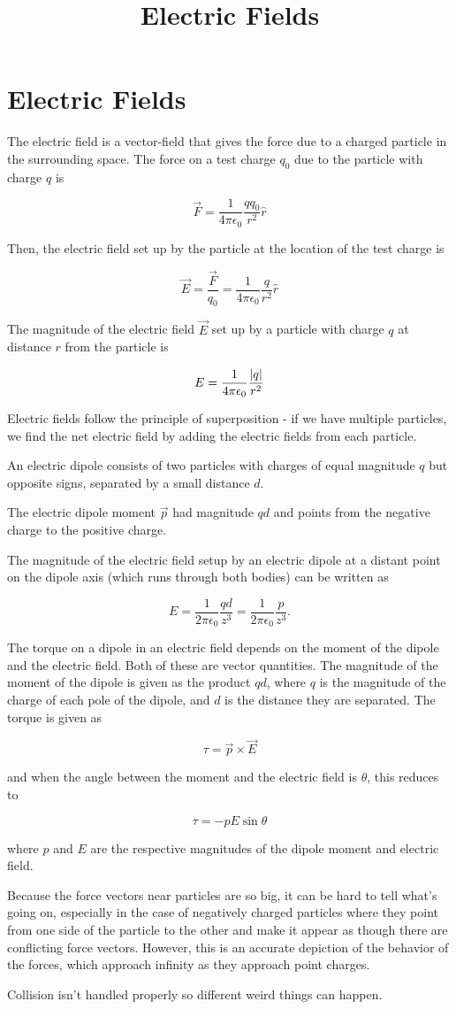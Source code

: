 \documentclass{article}
\title{Electric Fields}
\begin{document}
\section{Electric Fields}

The electric field is a \@{vector-field} that gives the force due to a charged particle in the surrounding space. The force on a test charge $q_0$ due to the particle with charge $q$ is

\[ \vec{F} = \frac{1}{4 \pi \epsilon_0} \frac{q q_0}{r^2} \hat{r} \]

Then, the electric field set up by the particle at the location of the test charge is

\[ \vec{E} = \frac{\vec{F}}{q_0}  = \frac{1}{4 \pi \epsilon_0} \frac{q}{r^2} \hat{r} \]

The \@{magnitude} of the electric field $\vec{E}$ set up by a particle with charge $q$ at distance $r$ from the particle is

\[ E  = \frac{1}{4 \pi \epsilon_0} \frac{\left| q \right|}{r^2} \]

Electric fields follow the principle of superposition - if we have multiple particles, we find the net electric field by adding the electric fields from each particle.

An electric dipole consists of two particles with charges of equal magnitude $q$ but opposite signs, separated by a small distance $d$.

The electric dipole moment $\vec{p}$ had magnitude $qd$ and points from the negative charge to the positive charge.

The magnitude of the electric field setup by an electric dipole at a distant point on the dipole axis (which runs through both bodies) can be written as

\[ E = \frac{1}{2 \pi \epsilon_0} \frac{qd}{z^3} = \frac{1}{2 \pi \epsilon_0} \frac{p}{z^3}. \]

The torque on a dipole in an electric field depends on the moment of the dipole and the electric field. Both of these are vector quantities. The magnitude of the moment of the dipole is given as the product $qd$, where $q$ is the magnitude of the charge of each pole of the dipole, and $d$ is the distance they are separated. The torque is given as

\[ \tau = \vec{p} \times \vec{E} \]

and when the angle between the moment and the electric field is $\theta$, this reduces to

\[ \tau = -pE\sin{\theta} \]

where $p$ and $E$ are the respective magnitudes of the dipole moment and electric field.


Because the force vectors near particles are so big, it can be hard to tell what's going on, especially in the case of negatively charged particles where they point from one side of the particle to the other and make it appear as though there are conflicting force vectors. However, this is an accurate depiction of the behavior of the forces, which approach infinity as they approach point charges.

Collision isn't handled properly so different weird things can happen.
\end{document}
